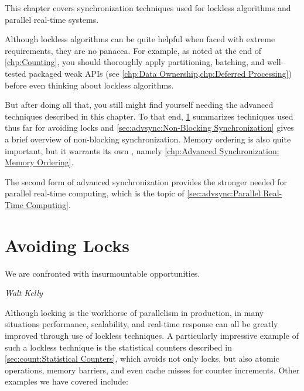 
%

This chapter covers synchronization techniques used for lockless
algorithms and parallel real-time systems.

Although lockless algorithms can be quite helpful when faced with
extreme requirements, they are no panacea.
For example, as noted at the end of \cref{chp:Counting},
you should thoroughly apply partitioning, batching, and
well-tested packaged weak APIs
(see \cref{chp:Data Ownership,chp:Deferred Processing})
before even thinking about lockless algorithms.

But after doing all that, you still might find yourself needing the
advanced techniques described in this chapter.
To that end,
\cref{sec:advsync:Avoiding Locks}
summarizes techniques used thus far for avoiding locks and
\cref{sec:advsync:Non-Blocking Synchronization}
gives a brief overview of non-blocking synchronization.
Memory ordering is also quite important, but it warrants its own
, namely
\cref{chp:Advanced Synchronization: Memory Ordering}.

The second form of advanced synchronization provides the stronger
 needed for parallel real-time computing,
which is the topic of
\cref{sec:advsync:Parallel Real-Time Computing}.

\section{Avoiding Locks}
\label{sec:advsync:Avoiding Locks}
%
\epigraph{We are confronted with insurmountable opportunities.}
	 {\emph{Walt Kelly}}

Although locking is the workhorse of parallelism in production, in
many situations performance, scalability, and real-time response can
all be greatly improved through use of lockless techniques.
A particularly impressive example of such a lockless technique is
the statistical counters described in
\cref{sec:count:Statistical Counters},
which avoids not only locks, but also atomic operations, memory barriers,
and even cache misses for counter increments.
Other examples we have covered include:

